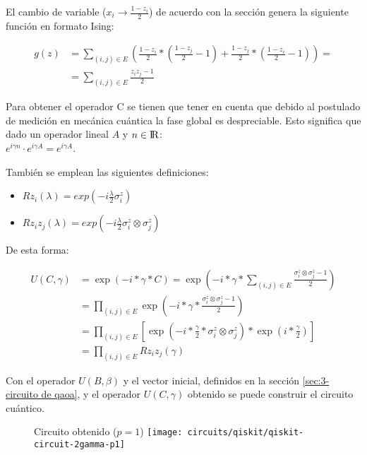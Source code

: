 El cambio de variable ($x_i \rightarrow \frac{1 - z_i}{2}$) de acuerdo con la sección  %
genera la siguiente función en formato Ising:

\begin{align*}
  g(z) &= \sum_{(i, j) \in E} (\frac{1 - z_i}{2} * (\frac{1 - z_j}{2} - 1) + \frac{1 - z_j}{2} * (\frac{1 - z_i}{2} - 1)) = \\
       &= \sum_{(i, j) \in E} \frac{z_iz_j - 1}{2}
\end{align*}

Para obtener el operador C se tienen que tener en cuenta que debido al postulado de medición en mecánica cuántica \cite{Nielsen_Chuang_2010} la fase global es despreciable. Esto significa que dado un operador lineal $A$ y $n \in {\rm I\!R}$: \\
\(e^{i \gamma n} \cdot e^{i \gamma A} = e^{i \gamma A}\).

También se emplean las siguientes definiciones:  %
\begin{itemize}
\item \( Rz_i(\lambda) = exp(-i\frac{\lambda}{2}\sigma_i^z) \)
\item \( Rz_iz_j(\lambda) = exp(-i\frac{\lambda}{2}\sigma_i^z \otimes \sigma_j^z) \)
\end{itemize}

De esta forma:

\begin{align*}
  U(C, \gamma) &=  \exp(-i*\gamma*C) = \exp(-i*\gamma* \sum_{(i, j) \in E} \frac{\sigma_i^z \otimes \sigma_j^z - 1}{2}) \\
          &= \prod_{(i, j) \in E} \exp(-i*\gamma* \frac{\sigma_i^z \otimes \sigma_j^z - 1}{2}) \\
          &= \prod_{(i, j) \in E} [ \exp(-i*\frac{\gamma}{2}* \sigma_i^z \otimes \sigma_j^z) * \exp(i*\frac{\gamma}{2}) ] \\
          &= \prod_{(i, j) \in E} Rz_iz_j(\gamma)
\end{align*}

Con el operador \(U(B, \beta)\) y el vector inicial, definidos en la sección \ref{sec:3-circuito de qaoa}, y el operador \(U(C, \gamma)\) obtenido se puede construir el circuito cuántico.

\begin{figure}[htbp]{}{ Circuito obtenido ($p=1$) }
  \centering
  \texttt{[image: circuits/qiskit/qiskit-circuit-2gamma-p1]}
\end{figure}

